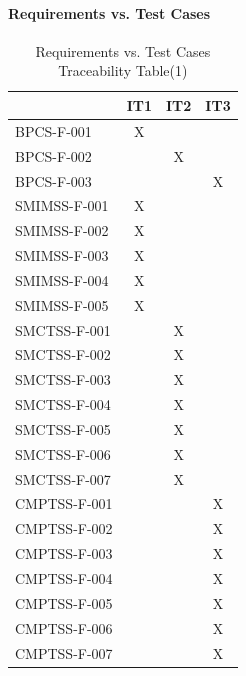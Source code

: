 			\paragraph{Requirements vs. Test Cases}
				\begin{table}[htbp]
				\centering
				\caption{Requirements vs. Test Cases Traceability Table(1)}
				\label{table11}
				\begin{tabular}{|l|c|c|c|}
				\hline
				 & \multicolumn{1}{l|}{IT1} & \multicolumn{1}{l|}{IT2} & \multicolumn{1}{l|}{IT3} \\ \hline
				BPCS-F-001 & X &  &  \\ \hline
				BPCS-F-002 &  & X &  \\ \hline
				BPCS-F-003 &  &  & X \\ \hline
				SMIMSS-F-001 & X &  &  \\ \hline
				SMIMSS-F-002 & X &  &  \\ \hline
				SMIMSS-F-003 & X &  &  \\ \hline
				SMIMSS-F-004 & X &  &  \\ \hline
				SMIMSS-F-005 & X &  &  \\ \hline
				SMCTSS-F-001 &  & X &  \\ \hline
				SMCTSS-F-002 &  & X &  \\ \hline
				SMCTSS-F-003 &  & X &  \\ \hline
				SMCTSS-F-004 &  & X &  \\ \hline
				SMCTSS-F-005 &  & X &  \\ \hline
				SMCTSS-F-006 &  & X &  \\ \hline
				SMCTSS-F-007 &  & X &  \\ \hline
				CMPTSS-F-001 &  &  & X \\ \hline
				CMPTSS-F-002 &  &  & X \\ \hline
				CMPTSS-F-003 & \multicolumn{1}{l|}{} & \multicolumn{1}{l|}{} & X \\ \hline
				CMPTSS-F-004 & \multicolumn{1}{l|}{} & \multicolumn{1}{l|}{} & X \\ \hline
				CMPTSS-F-005 & \multicolumn{1}{l|}{} & \multicolumn{1}{l|}{} & X \\ \hline
				CMPTSS-F-006 & \multicolumn{1}{l|}{} & \multicolumn{1}{l|}{} & X \\ \hline
				CMPTSS-F-007 & \multicolumn{1}{l|}{} & \multicolumn{1}{l|}{} & X \\ \hline
				\end{tabular}
				\end{table}

